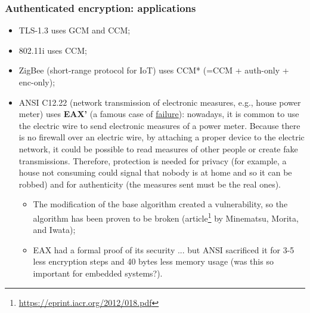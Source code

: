 \subsubsection{Authenticated encryption: applications}
\begin{itemize}
    \item TLS-1.3 uses GCM and CCM;
    \item 802.11i uses CCM;
    \item ZigBee (short-range protocol for IoT) uses CCM* (=CCM + auth-only + enc-only);
    \item ANSI C12.22 (network transmission of electronic measures, e.g., house power meter) uses \textbf{EAX'} (a famous case of \underline{failure}): nowadays, it is common to use the electric wire to send electronic measures of a power meter. Because there is no firewall over an electric wire, by attaching a proper device to the electric network, it could be possible to read measures of other people or create fake transmissions. Therefore, protection is needed for privacy (for example, a house not consuming could signal that nobody is at home and so it can be robbed) and for authenticity (the measures sent must be the real ones).
          \begin{itemize}
              \item The modification of the base algorithm created a vulnerability, so the algorithm has been proven to be broken (article\footnote{\url{https://eprint.iacr.org/2012/018.pdf}} by Minematsu, Morita, and Iwata);
              \item EAX had a formal proof of its security ... but ANSI sacrificed it for 3-5 less encryption steps and 40 bytes less memory usage (was this so important for embedded systems?).
          \end{itemize}
\end{itemize}



